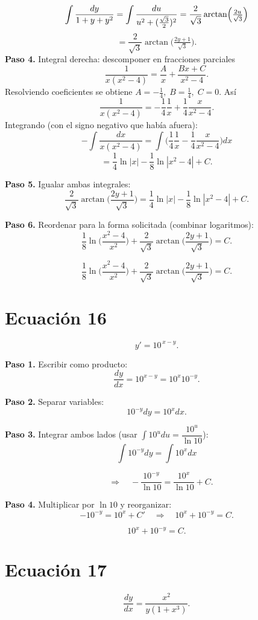 \documentclass[12pt,a4paper]{article}
\begin{document}
\begin{multicols}{2}
	\[
	\int\frac{dy}{1+y+y^{2}} 
	= \int\frac{du}{u^{2}+(\tfrac{\sqrt{3}}{2})^{2}}\\
	= \frac{2}{\sqrt{3}}\arctan\!\Big(\tfrac{2u}{\sqrt{3}}\Big)\\
	\]
	\[
	= \frac{2}{\sqrt{3}}\arctan\!\Big(\tfrac{2y+1}{\sqrt{3}}\Big).
	\]
	\textbf{Paso 4.} Integral derecha: descomponer en fracciones parciales
	\[
	\frac{1}{x(x^{2}-4)}=\frac{A}{x}+\frac{Bx+C}{x^{2}-4}.
	\]
	Resolviendo coeficientes se obtiene \(A=-\tfrac{1}{4},\;B=\tfrac{1}{4},\;C=0\). Así
	\[
	\frac{1}{x(x^{2}-4)}=-\frac{1}{4}\frac{1}{x}+\frac{1}{4}\frac{x}{x^{2}-4}.
	\]
	Integrando (con el signo negativo que había afuera):
	\[
	-\int\frac{dx}{x(x^{2}-4)}=\int\Big(\frac{1}{4}\frac{1}{x}-\frac{1}{4}\frac{x}{x^{2}-4}\Big)dx
	\]
	\[	
	=\frac{1}{4}\ln|x|-\frac{1}{8}\ln|x^{2}-4|+C.
	\]
	
	\textbf{Paso 5.} Igualar ambas integrales:
	\[
	\frac{2}{\sqrt{3}}\arctan\!\Big(\frac{2y+1}{\sqrt{3}}\Big)
	=\frac{1}{4}\ln|x|-\frac{1}{8}\ln|x^{2}-4|+C.
	\]
	
	\textbf{Paso 6.} Reordenar para la forma solicitada (combinar logaritmos):
	\[
	\frac{1}{8}\ln\!\Big(\frac{x^{2}-4}{x^{2}}\Big)+\frac{2}{\sqrt{3}}\arctan\!\Big(\frac{2y+1}{\sqrt{3}}\Big)=C.
	\]
	
	\[
	\boxed{\displaystyle \frac{1}{8}\ln\!\Big(\frac{x^{2}-4}{x^{2}}\Big)+\frac{2}{\sqrt{3}}\arctan\!\Big(\frac{2y+1}{\sqrt{3}}\Big)=C.}
	\]
	
	\section*{Ecuación 16}
	\[
	y' = 10^{\,x-y}.
	\]
	
	\textbf{Paso 1.} Escribir como producto:
	\[
	\frac{dy}{dx}=10^{x-y}=10^{x}10^{-y}.
	\]
	
	\textbf{Paso 2.} Separar variables:
	\[
	10^{-y}dy = 10^{x}dx.
	\]
	
	\textbf{Paso 3.} Integrar ambos lados (usar \(\int 10^{u}du=\dfrac{10^{u}}{\ln 10}\)):
	\[
	\int 10^{-y}dy=\int 10^{x}dx
	\]

  \[
	\quad\Rightarrow\quad
	-\frac{10^{-y}}{\ln 10}=\frac{10^{x}}{\ln 10}+C.\]
	
	\textbf{Paso 4.} Multiplicar por \(\ln 10\) y reorganizar:
	\[
	-10^{-y}=10^{x}+C' \quad\Rightarrow\quad 10^{x}+10^{-y}=C.
	\]
	
	\[
	\boxed{10^{x}+10^{-y}=C.}
	\]
	
	\section*{Ecuación 17}
	\[
	\frac{dy}{dx}=\frac{x^{2}}{y(1+x^{3})}.
	\]
	

\end{multicols}
\end{document}
